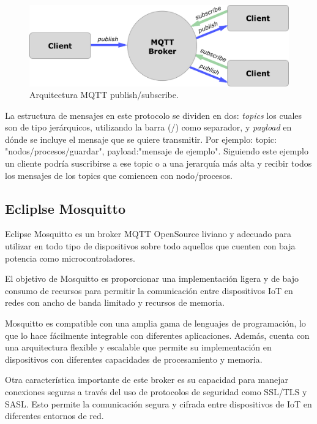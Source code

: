 \begin{figure}[ht]
	\centering
	\includegraphics[scale=.25]{./Figures/mqtt-diagram.png}
	\caption{Arquitectura MQTT publish/subscribe.}
	\label{fig:mqttArq}
\end{figure}

La estructura de mensajes en este protocolo se dividen en dos: \textit{topics} los cuales son de tipo jerárquicos, utilizando la barra (/) como separador, y \textit{payload} en dónde se incluye el mensaje que se quiere transmitir. Por ejemplo: topic: "nodos/procesos/guardar", payload:"mensaje de ejemplo". Siguiendo este ejemplo un cliente podría suscribirse a ese topic o a una jerarquía más alta y recibir todos los mensajes de los topics que comiencen con nodo/procesos. 

\subsection{Ecliplse Mosquitto}
\label{subsec:mosquitto}

Eclipse Mosquitto \citep{WEBSITE:MOSQUITTO} es un broker MQTT OpenSource liviano y adecuado para utilizar en todo tipo de dispositivos sobre todo aquellos que cuenten con baja potencia como microcontroladores.

El objetivo de Mosquitto es proporcionar una implementación ligera y de bajo consumo de recursos para permitir la comunicación entre dispositivos IoT en redes con ancho de banda limitado y recursos de memoria.

Mosquitto es compatible con una amplia gama de lenguajes de programación, lo que lo hace fácilmente integrable con diferentes aplicaciones. Además, cuenta con una arquitectura flexible y escalable que permite su implementación en dispositivos con diferentes capacidades de procesamiento y memoria.

Otra característica importante de este broker es su capacidad para manejar conexiones seguras a través del uso de protocolos de seguridad como SSL/TLS y SASL. Esto permite la comunicación segura y cifrada entre dispositivos de IoT en diferentes entornos de red.	

